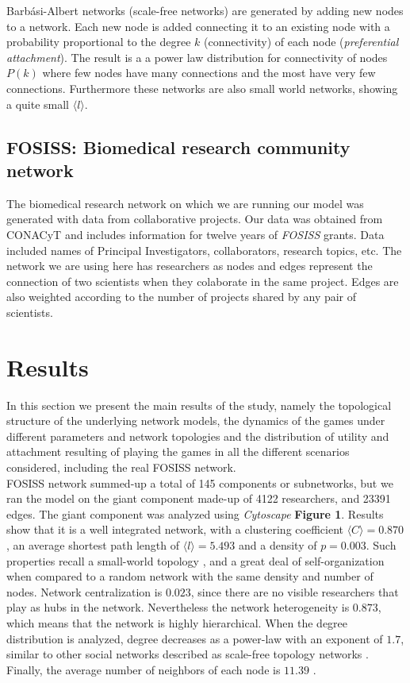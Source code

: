 \documentclass[11pt]{article}
\begin{document}
Barb\'asi-Albert networks \cite{Barabasi1999} (scale-free networks) are generated by adding new nodes to a network. Each new node is added connecting it to an existing node with a probability proportional to the degree $k$ (connectivity) of each node (\textit{preferential attachment}). The result is a a power law distribution for connectivity of nodes $P(k)$ where few nodes have many connections and the most have very few connections. Furthermore these networks are also small world networks, showing a quite small $\langle l \rangle$.


\subsection{FOSISS: Biomedical research community network}

The biomedical research network on which we are running our model was generated 
with data from collaborative projects. Our data was obtained from CONACyT and includes information for twelve years of \textit{FOSISS} grants. Data included names of Principal Investigators, collaborators, research topics, etc. The network we are using here has researchers as nodes and edges represent the connection of two scientists when they colaborate in the same project. Edges are also weighted according to the number of projects shared by any pair of scientists.\\


\section{Results}
\label{sec:3}

In this section we present the main results of the study, namely the topological
structure of the underlying network models, the dynamics of the games under
different parameters and network topologies and the distribution of utility and
attachment resulting of playing the games in all the different scenarios
considered, including the real FOSISS network.\\ 


FOSISS network summed-up a total of 145 components or subnetworks, but we ran
the model on the giant component made-up of 4122 researchers, and 23391 edges.
The giant component was analyzed using \textit{Cytoscape} \textbf{Figure
  1}. Results show that it is a well integrated network, with a clustering
coefficient $\langle C \rangle = 0.870$, an average shortest path length of
$\langle l \rangle = 5.493$  and a density of $p = 0.003$. Such properties
recall a small-world topology \cite{Watts1998}, and a great deal of
self-organization when compared to a random network with the same density and
number of nodes. Network centralization is $0.023$, since there are no visible
researchers that play as hubs in the network. Nevertheless the network
heterogeneity is $0.873$, which means that the network is highly
hierarchical. When the degree distribution is analyzed, degree decreases as a
power-law with an exponent of $1.7$, similar to other social networks described
as scale-free topology networks \cite{Barabasi1999}. Finally, the average number
of neighbors of each node is $11.39$ \cite{Shannon2003}.\\
\end{document}
